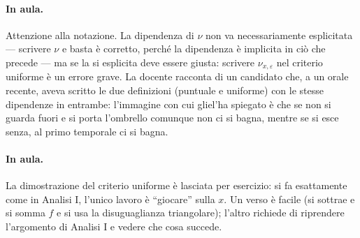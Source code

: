 \paragraph{In aula.} Attenzione alla notazione. La dipendenza di $\nu$ non va
necessariamente esplicitata — scrivere $\nu$ e basta è corretto, perché la dipendenza è
implicita in ciò che precede — ma se la si esplicita deve essere giusta: scrivere
$\nu_{x,\varepsilon}$ nel criterio uniforme è un errore grave. La docente racconta di un
candidato che, a un orale recente, aveva scritto le due definizioni (puntuale e uniforme)
con le stesse dipendenze in entrambe: l'immagine con cui gliel'ha spiegato è che se non si
guarda fuori e si porta l'ombrello comunque non ci si bagna, mentre se si esce senza, al
primo temporale ci si bagna.

\paragraph{In aula.} La dimostrazione del criterio uniforme è lasciata per esercizio: si
fa esattamente come in Analisi I, l'unico lavoro è ``giocare'' sulla $x$. Un verso è
facile (si sottrae e si somma $f$ e si usa la disuguaglianza triangolare); l'altro richiede
di riprendere l'argomento di Analisi I e vedere che cosa succede.

